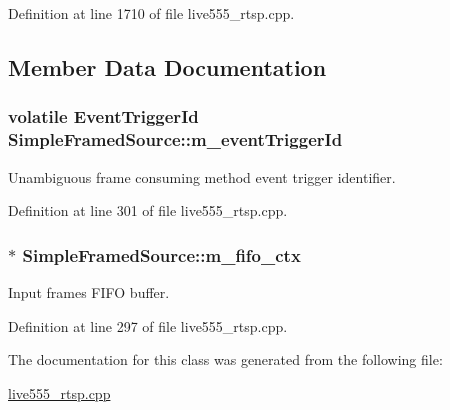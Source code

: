 Definition at line 1710 of file live555\+\_\+rtsp.\+cpp.



\subsection{Member Data Documentation}
\subsubsection[{\texorpdfstring{m\+\_\+event\+Trigger\+Id}{m_eventTriggerId}}]{\setlength{\rightskip}{0pt plus 5cm}volatile Event\+Trigger\+Id Simple\+Framed\+Source\+::m\+\_\+event\+Trigger\+Id}\hypertarget{classSimpleFramedSource_a6de7be242a550522e914316487fa112e}{}\label{classSimpleFramedSource_a6de7be242a550522e914316487fa112e}
Unambiguous frame consuming method event trigger identifier. 

Definition at line 301 of file live555\+\_\+rtsp.\+cpp.

\subsubsection[{\texorpdfstring{m\+\_\+fifo\+\_\+ctx}{m_fifo_ctx}}]{$\ast$ Simple\+Framed\+Source\+::m\+\_\+fifo\+\_\+ctx}\hypertarget{classSimpleFramedSource_ab93999240c393d2d3035dc7e5292eb2c}{}\label{classSimpleFramedSource_ab93999240c393d2d3035dc7e5292eb2c}
Input frames F\+I\+FO buffer. 

Definition at line 297 of file live555\+\_\+rtsp.\+cpp.



The documentation for this class was generated from the following file\+:\begin{DoxyCompactItemize}
\item 
\hyperlink{live555__rtsp_8cpp}{live555\+\_\+rtsp.\+cpp}\end{DoxyCompactItemize}
